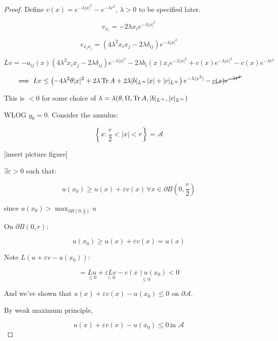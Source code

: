 \documentclass{article}
\theoremstyle{definition}
\begin{document}
\begin{proof}
    Define \(v(x) = e^{-\lambda \vert x \vert ^2} - e^{-\lambda r^2}\), \(\lambda > 0\) to be specified later.

    \[
        v_{x_i} = - 2 \lambda x_i e^{-\lambda \vert x \vert ^ 2} 
    \]

    \[
        v_{x_i x_j} = (4 \lambda^2 x_i x_j - 2 \lambda \delta_{ij})e^{-\lambda \vert x \vert^2}
    \]

    \[
        Lv = - a_{ij}(x) ( 4\lambda ^2 x_i x_j - 2 \lambda \delta_{ij}) e^{-\lambda \vert x \vert ^ 2} - 2 \lambda b_i (x) x_i e^{-\lambda \vert x \vert^2} + c(x) e^{-\lambda \vert x \vert^2} - c(x) e^{-\lambda r^2}  
    \]

    \[
        \implies Lv \leq \left( - 4 \lambda^2 \theta \vert x \vert ^ 2 + 2 \lambda \Tr A + 2 \lambda \vert b \vert _{L^{\infty}} \vert x \vert + \vert c \vert _{L^{\infty}}\right) e^{-\lambda \vert x^2 \vert} - \cancel{c(x) e^{-\lambda r^2}}
    \]

    This is \(< 0\) for some choice of \(\lambda  = \lambda(\theta , \Omega, \Tr A, \vert b \vert_{L^{\infty}}, \vert c \vert_{L^{\infty}})\) 

    WLOG \(y_0 = 0\). Consider the annulus:

    \[
        \left\{ x : \frac{r}{2} < \vert x \vert < r \right\} = \mathcal{A}
    \]

    [insert picture figure]

    \(\exists \varepsilon > 0\) such that:

    \[
        u(x_0) \geq u(x) + \varepsilon v(x) \, \forall x\in \partial B\left(0, \frac{r}{2}\right)
    \]

    since \(u(x_0) > \max_{\partial B(0, \frac{r}{2})} u\) 

    On \(\partial B(0,r)\):

    \[
        u(x_0) \geq u(x) + \varepsilon v(x) = u(x)
    \]

    Note \(L(u+\varepsilon v - u(x_0))\):

    \[
        = \underset{\leq 0}{Lu} + \underset{< 0}{\varepsilon L v} - \underset{\leq 0}{c(x) u(x_0)}  < 0
    \]

    And we've shown that \(u(x) + \varepsilon v(x) - u(x_0) \leq 0\) on \(\partial \mathcal{A}\).

    By weak maximum principle, 

    \[
        u(x) + \varepsilon v(x) - u(x_0) \leq 0 \, \text{in } \mathcal{A}
    \]


\end{proof}
\end{document}
